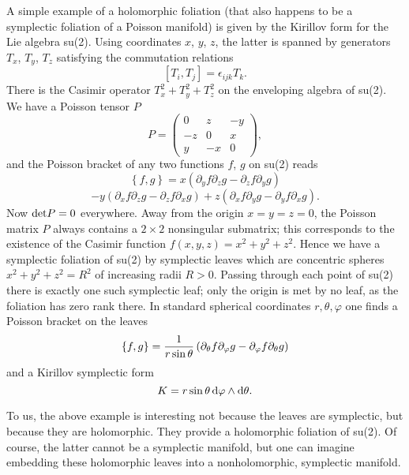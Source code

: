\documentclass[a4paper,a4paper]{article}
\begin{document}
A simple example of a holomorphic foliation (that also happens to be 
a symplectic foliation of a Poisson manifold) is given by the Kirillov form 
\cite{LIBAZCA} for the Lie algebra su(2).  Using coordinates $x$, $y$, $z$, the latter
is spanned by generators $T_x$, $T_y$, $T_z$ satisfying the commutation relations
\begin{equation}
\left[ T_i, T_j\right]=\epsilon_{ijk}T_k.
\label{commut}
\end{equation}
There is the Casimir operator $T_x^2+T_y^2+T_z^2$ on the enveloping algebra 
of su(2). We have a Poisson tensor $P$
\begin{equation}
P=\left( \begin{array}{ccc}
 0& z& -y\\
-z& 0& x\\
 y& -x& 0
\end{array} \right),
\label{matriz}
\end{equation}
and the Poisson bracket of any two functions $f$, $g$ on su(2) reads
$$
\left\{f,g\right\}= 
x\left(\partial_y f \partial_z g - \partial_z f \partial_y g\right) 
$$
\begin{equation}
-y\left(\partial_x f \partial_z g - \partial_z f \partial_x g\right) +
z\left(\partial_x f \partial_y g - \partial_y f \partial_x g\right).
\label{poibra}
\end{equation}
Now ${\rm det} P=0$ everywhere. Away from the origin $x=y=z=0$, the Poisson matrix $P$
always contains a $2\times 2$ nonsingular submatrix; this corresponds to 
the existence of the Casimir function $f(x,y,z)=x^2+y^2+z^2$. Hence we have 
a symplectic foliation of su(2) by symplectic leaves which are concentric spheres 
$x^2+y^2+z^2=R^2$ of increasing radii $R>0$. Passing through each point of su(2) 
there is exactly one such symplectic leaf; only the origin is met by no leaf, 
as the foliation has  zero rank there. In standard spherical coordinates 
$r, \theta, \varphi$  one 
finds a Poisson bracket on the leaves 
\begin{equation}
\left\{f,g\right\}={1\over r\sin\theta}\left(\partial_{\theta}f 
\partial_{\varphi}g - \partial_{\varphi}f \partial_{\theta}g\right)
\label{ssphc}
\end{equation}
and a Kirillov symplectic form 
\begin{equation}
K=r\sin \theta\, {\rm d} \varphi\wedge {\rm d} \theta.
\label{kiri}
\end{equation}

To us, the above example is interesting not because the leaves are symplectic, 
but because they are holomorphic. They provide a holomorphic foliation of 
su(2). Of course, the latter cannot be a symplectic manifold, 
but one can imagine embedding these holomorphic leaves into a nonholomorphic, 
symplectic manifold.
\end{document}
